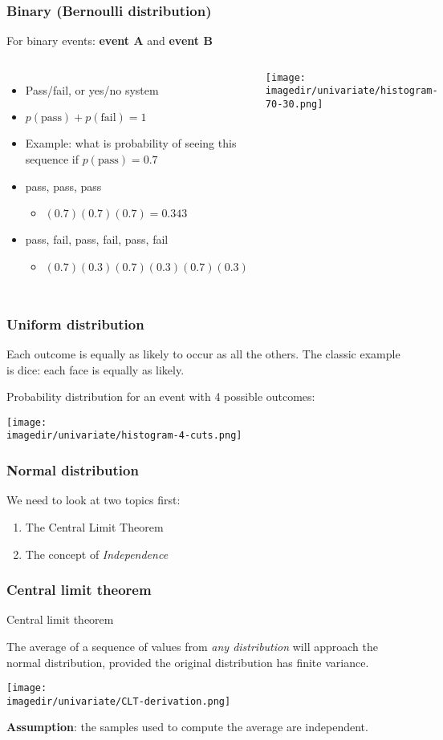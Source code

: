 \begin{frame}\frametitle{Binary (Bernoulli distribution)}
	For binary events: \textbf{event A} and \textbf{event B}
	\begin{columns}
		\column{6cm}
		\begin{itemize}
			\item	Pass/fail, or yes/no system
			\item	$p(\text{pass}) + p(\text{fail}) = 1$
			\item	Example: what is probability of seeing this sequence if $p(\text{pass}) = 0.7$
			\item	pass, pass, pass
			\begin{itemize}
				\item	$(0.7)(0.7)(0.7) = 0.343$
			\end{itemize}
			\item	pass, fail, pass, fail, pass, fail
			\begin{itemize}
				\item	$(0.7)(0.3)(0.7)(0.3)(0.7)(0.3)$
			\end{itemize}
		\end{itemize}
		\column{5cm}
		\texttt{[image: \\imagedir/univariate/histogram-70-30.png]}
	\end{columns}
\end{frame}

\begin{frame}\frametitle{Uniform distribution}
	Each outcome is equally as likely to occur as all the others. The classic example is dice: each face is equally as likely.

	Probability distribution for an event with 4 possible outcomes:
	\begin{center}
		\texttt{[image: \\imagedir/univariate/histogram-4-cuts.png]}
	\end{center}
\end{frame}

\begin{frame}\frametitle{Normal distribution}

	We need to look at two topics first:
	\begin{enumerate}
		\item	The Central Limit Theorem
		\item	The concept of \emph{Independence}
	\end{enumerate}
\end{frame}

\begin{frame}\frametitle{Central limit theorem}
	\begin{block}
		{Central limit theorem}
		\begin{center}
			The average of a sequence of values from \emph{any distribution} will approach the normal distribution, provided the original distribution has finite variance.
		\end{center}
	\end{block}

	\texttt{[image: \\imagedir/univariate/CLT-derivation.png]}

	\textbf{Assumption}: the samples used to compute the average are independent.
\end{frame}

